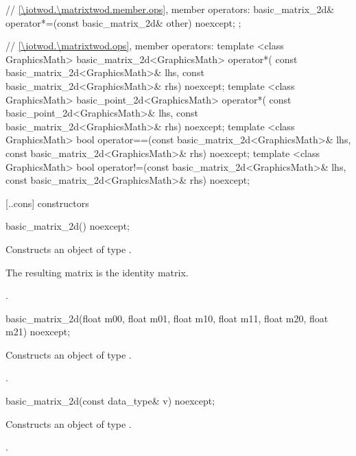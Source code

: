 \begin{codeblock}
{{    // \ref{\iotwod.\matrixtwod.member.ops}, member operators:
    basic_matrix_2d& operator*=(const basic_matrix_2d& other) noexcept;
  };

  // \ref{\iotwod.\matrixtwod.ops}, member operators:
  template <class GraphicsMath>
  basic_matrix_2d<GraphicsMath> operator*(
    const basic_matrix_2d<GraphicsMath>& lhs,
    const basic_matrix_2d<GraphicsMath>& rhs) noexcept;
  template <class GraphicsMath>
  basic_point_2d<GraphicsMath> operator*(
    const basic_point_2d<GraphicsMath>& lhs,
    const basic_matrix_2d<GraphicsMath>& rhs) noexcept;
  template <class GraphicsMath>
  bool operator==(const basic_matrix_2d<GraphicsMath>& lhs,
    const basic_matrix_2d<GraphicsMath>& rhs) noexcept;
  template <class GraphicsMath>
  bool operator!=(const basic_matrix_2d<GraphicsMath>& lhs,
    const basic_matrix_2d<GraphicsMath>& rhs) noexcept;
}
\end{codeblock}

 [\iotwod.\matrixtwod.cons] { constructors}

%
\begin{itemdecl}
basic_matrix_2d() noexcept;
\end{itemdecl}
\begin{itemdescr}
\pnum
\effects
Constructs an object of type .

\pnum
\begin{note}
The resulting matrix is the identity matrix.
\end{note}

\pnum
\postconditions
{}.
\end{itemdescr}

%
\begin{itemdecl}
basic_matrix_2d(float m00, float m01, float m10, float m11,
  float m20, float m21) noexcept;
\end{itemdecl}
\begin{itemdescr}
\pnum
\effects
Constructs an object of type .

\pnum
\postconditions{} .
\end{itemdescr}

%
\begin{itemdecl}
basic_matrix_2d(const data_type& v) noexcept;
\end{itemdecl}
\begin{itemdescr}
\pnum
\effects
Constructs an object of type .
	
\pnum
\postconditions{} .
\end{itemdescr}

